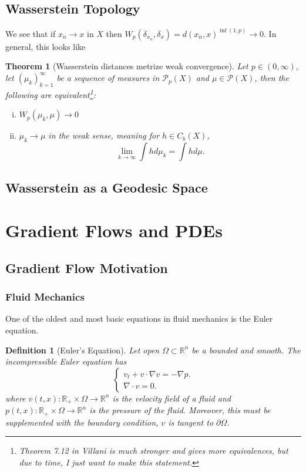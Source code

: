 \documentclass[12pt]{article}
\newcommand{\R}{\mathbb{R}}
\theoremstyle{plain}
\newtheorem{thm}{Theorem}[section]
\newtheorem{defn}{Definition}[section]
\numberwithin{equation}{section}
\begin{document}
\subsection{Wasserstein Topology}
We see that if $x_n\to x$ in $X$ then
\(W_p(\delta_{x_n},\delta_x) = d(x_n,x)^{\inf{(1,p)}} \to 0\). In general, this looks like
\begin{thm}[Wasserstein distances metrize weak convergence]
	Let $p\in(0,\infty)$, let $(\mu_k)_{k=1}^\infty$ be a sequence of measures in $\mathcal{P}_p(X)$ and $\mu\in \mathcal{P}(X)$, then the following are equivalent\footnote{Theorem 7.12 in Villani is much stronger and gives more equivalences, but due to time, I just want to make this statement.}:
	\begin{enumerate}[(i)]
		\item $W_p(\mu_k,\mu)\to 0$
		\item $\mu_k\to\mu$ in the weak sense, meaning for $h\in C_b(X)$,
		\[\lim_{k\to\infty}\int hd\mu_k = \int hd\mu.\]
	\end{enumerate} 
\end{thm}
\subsection{Wasserstein as a Geodesic Space}
\section{Gradient Flows and PDEs}
\subsection{Gradient Flow Motivation}
\subsubsection{Fluid Mechanics}
One of the oldest and most basic equations in fluid mechanics is the Euler equation. 
\begin{defn}[Euler's Equation]
  Let open $\Omega\subset\R^n$ be a bounded and smooth. The incompressible Euler equation has
  \begin{equation}
    \begin{cases}
      v_t + v \cdot \nabla v = - \nabla p. \\
      \nabla \cdot v = 0.
    \end{cases}
  \end{equation}
  where $v(t,x): \R_+ \times \Omega \to \R^n$ is the velocity field of a fluid and $p(t,x):\R_+\times \Omega \to \R^n$ is the pressure of the fluid. Moreover, this must be supplemented with the boundary condition, $v$ is tangent to $\partial \Omega$.
\end{defn}
\end{document}
